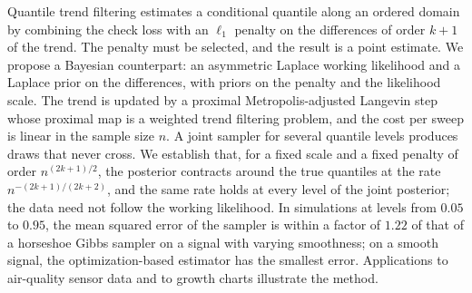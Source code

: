 Quantile trend filtering estimates a conditional quantile along an ordered domain by combining the check loss with an $\ell_1$ penalty on the differences of order $k+1$ of the trend. The penalty must be selected, and the result is a point estimate. We propose a Bayesian counterpart: an asymmetric Laplace working likelihood and a Laplace prior on the differences, with priors on the penalty and the likelihood scale. The trend is updated by a proximal Metropolis-adjusted Langevin step whose proximal map is a weighted trend filtering problem, and the cost per sweep is linear in the sample size $n$. A joint sampler for several quantile levels produces draws that never cross. We establish that, for a fixed scale and a fixed penalty of order $n^{(2k+1)/2}$, the posterior contracts around the true quantiles at the rate $n^{-(2k+1)/(2k+2)}$, and the same rate holds at every level of the joint posterior; the data need not follow the working likelihood. In simulations at levels from $0.05$ to $0.95$, the mean squared error of the sampler is within a factor of $1.22$ of that of a horseshoe Gibbs sampler on a signal with varying smoothness; on a smooth signal, the optimization-based estimator has the smallest error. Applications to air-quality sensor data and to growth charts illustrate the method.

